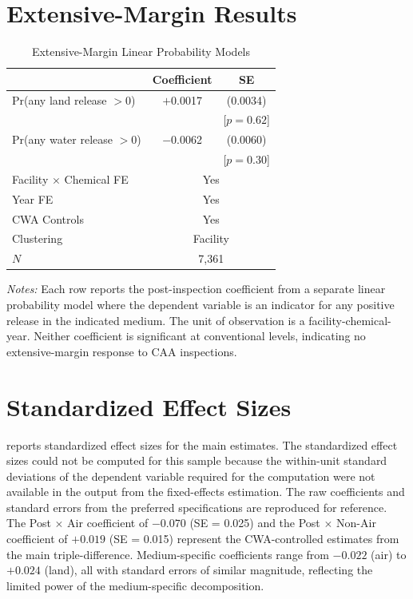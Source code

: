 \documentclass[12pt]{article}
\begin{document}
\section{Extensive-Margin Results}
\label{sec:extensive_appendix}

\begin{table}[htbp]
\centering
\caption{Extensive-Margin Linear Probability Models}
\label{tab:extensive}
\begin{tabular}{lcc}
\toprule
& Coefficient & SE \\
\midrule
Pr(any land release $> 0$) & $+$0.0017 & (0.0034) \\
& & [$p = 0.62$] \\[6pt]
Pr(any water release $> 0$) & $-$0.0062 & (0.0060) \\
& & [$p = 0.30$] \\
\midrule
Facility $\times$ Chemical FE & \multicolumn{2}{c}{Yes} \\
Year FE & \multicolumn{2}{c}{Yes} \\
CWA Controls & \multicolumn{2}{c}{Yes} \\
Clustering & \multicolumn{2}{c}{Facility} \\
$N$ & \multicolumn{2}{c}{7,361} \\
\bottomrule
\end{tabular}
\begin{minipage}{0.95\textwidth}
\vspace{0.3em}
\footnotesize \textit{Notes:} Each row reports the post-inspection coefficient from a separate linear probability model where the dependent variable is an indicator for any positive release in the indicated medium. The unit of observation is a facility-chemical-year. Neither coefficient is significant at conventional levels, indicating no extensive-margin response to CAA inspections.
\end{minipage}
\end{table}


\section{Standardized Effect Sizes}
\label{sec:sde}



 reports standardized effect sizes for the main estimates. The standardized effect sizes could not be computed for this sample because the within-unit standard deviations of the dependent variable required for the computation were not available in the output from the fixed-effects estimation. The raw coefficients and standard errors from the preferred specifications are reproduced for reference. The Post $\times$ Air coefficient of $-0.070$ (SE = 0.025) and the Post $\times$ Non-Air coefficient of $+0.019$ (SE = 0.015) represent the CWA-controlled estimates from the main triple-difference. Medium-specific coefficients range from $-0.022$ (air) to $+0.024$ (land), all with standard errors of similar magnitude, reflecting the limited power of the medium-specific decomposition.
\end{document}
